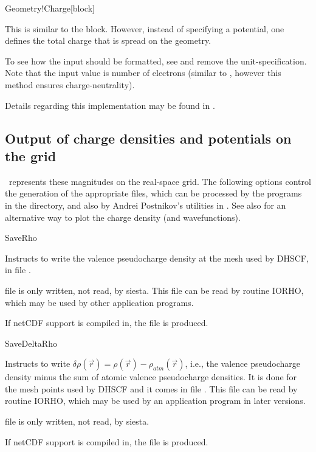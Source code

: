 \begin{fdfentry}{Geometry!Charge}[block]%

  This is similar to the  block. However,
  instead of specifying a potential, one defines the total charge that
  is spread on the geometry. 

  To see how the input should be formatted, see
   and remove the unit-specification. Note that
  the input value is number of electrons (similar to ,
  however this method ensures charge-neutrality).

  Details regarding this implementation may be found in
  \citet{Papior2016a}.

\end{fdfentry}




\subsection{Output of charge densities and potentials on the grid}

\siesta\ represents these magnitudes on the real-space grid. The
following options control the generation of the appropriate files,
which can be processed by the programs in the 
directory, and also by Andrei Postnikov's utilities in
. See also  for
an alternative way to plot the charge density (and wavefunctions).

\begin{fdflogicalF}{SaveRho}

  Instructs to write the valence pseudocharge density at the mesh used
  by DHSCF, in file .

  \note file  is only written, not read, by siesta.
  This file can be read by routine IORHO, which may be used by other
  application programs.

  If netCDF support is compiled in, the file  is
  produced.
  
\end{fdflogicalF}

\begin{fdflogicalF}{SaveDeltaRho}

  Instructs to write
  $\delta \rho(\vec r) = \rho(\vec r) - \rho_{atm}(\vec r)$, i.e., the
  valence pseudocharge density minus the sum of atomic valence
  pseudocharge densities. It is done for the mesh points used by DHSCF
  and it comes in file . This file can be
  read by routine IORHO, which may be used by an application program
  in later versions.

  \note file  is only written, not read, by siesta.

  If netCDF support is compiled in, the file 
  is produced.

\end{fdflogicalF}

